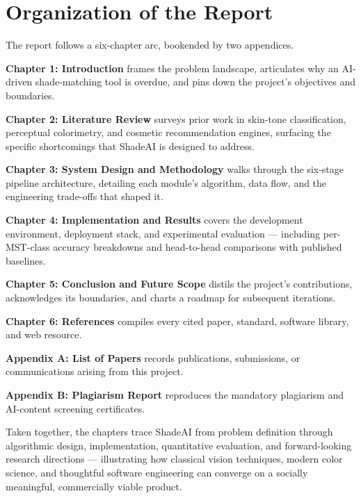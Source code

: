 \section{Organization of the Report}

The report follows a six-chapter arc, bookended by two appendices.

\textbf{Chapter 1: Introduction} frames the problem landscape, articulates why an AI-driven shade-matching tool is overdue, and pins down the project's objectives and boundaries.

\textbf{Chapter 2: Literature Review} surveys prior work in skin-tone classification, perceptual colorimetry, and cosmetic recommendation engines, surfacing the specific shortcomings that ShadeAI is designed to address.

\textbf{Chapter 3: System Design and Methodology} walks through the six-stage pipeline architecture, detailing each module's algorithm, data flow, and the engineering trade-offs that shaped it.

\textbf{Chapter 4: Implementation and Results} covers the development environment, deployment stack, and experimental evaluation — including per-MST-class accuracy breakdowns and head-to-head comparisons with published baselines.

\textbf{Chapter 5: Conclusion and Future Scope} distils the project's contributions, acknowledges its boundaries, and charts a roadmap for subsequent iterations.

\textbf{Chapter 6: References} compiles every cited paper, standard, software library, and web resource.

\textbf{Appendix A: List of Papers} records publications, submissions, or communications arising from this project.

\textbf{Appendix B: Plagiarism Report} reproduces the mandatory plagiarism and AI-content screening certificates.

\vspace{0.5cm}

Taken together, the chapters trace ShadeAI from problem definition through algorithmic design, implementation, quantitative evaluation, and forward-looking research directions — illustrating how classical vision techniques, modern color science, and thoughtful software engineering can converge on a socially meaningful, commercially viable product.
